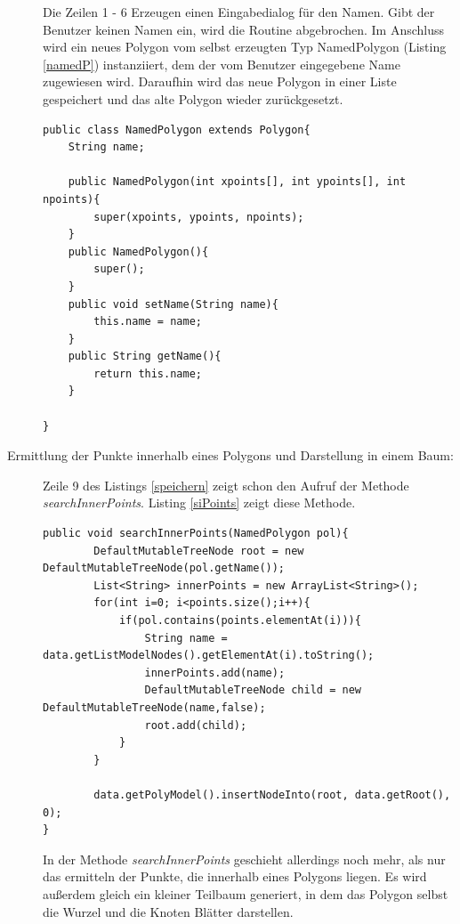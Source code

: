 \begin{description}
Die Zeilen 1 - 6 Erzeugen einen Eingabedialog für den Namen. Gibt der Benutzer keinen Namen ein, wird die Routine abgebrochen. Im Anschluss wird ein neues Polygon vom selbst erzeugten Typ NamedPolygon (Listing \ref{namedP}) instanziiert, dem der vom Benutzer eingegebene Name zugewiesen wird. Daraufhin wird das neue Polygon in einer Liste gespeichert und das alte Polygon wieder zurückgesetzt. 
\begin{lstlisting}[captionpos=b, caption=Klassendefinition des NamedPolygon, label=namedP]
public class NamedPolygon extends Polygon{
    String name;

    public NamedPolygon(int xpoints[], int ypoints[], int npoints){
        super(xpoints, ypoints, npoints);
    }
    public NamedPolygon(){
        super();
    }
    public void setName(String name){
        this.name = name;
    }
    public String getName(){
        return this.name;
    }

}
\end{lstlisting}

\item[Ermittlung der Punkte innerhalb eines Polygons und Darstellung in einem Baum:] Zeile 9 des Listings \ref{speichern} zeigt schon den Aufruf der Methode \emph{searchInnerPoints}. Listing \ref{siPoints} zeigt diese Methode.
\begin{lstlisting}[captionpos=b, caption=Methode searchInnerPoints, label=siPoints]
public void searchInnerPoints(NamedPolygon pol){
        DefaultMutableTreeNode root = new DefaultMutableTreeNode(pol.getName());
        List<String> innerPoints = new ArrayList<String>();
        for(int i=0; i<points.size();i++){
            if(pol.contains(points.elementAt(i))){
                String name = data.getListModelNodes().getElementAt(i).toString();
                innerPoints.add(name);
                DefaultMutableTreeNode child = new DefaultMutableTreeNode(name,false);
                root.add(child);
            }
        }
        
        data.getPolyModel().insertNodeInto(root, data.getRoot(), 0);
}
\end{lstlisting}

In der Methode \emph{searchInnerPoints} geschieht allerdings noch mehr, als nur das ermitteln der Punkte, die innerhalb eines Polygons liegen. Es wird außerdem gleich ein kleiner Teilbaum generiert, in dem das Polygon  selbst die Wurzel und die Knoten Blätter darstellen.

\end{description}

\begin{lstlisting}[captionpos=b, caption=Mehr Text, label=code]

\end{lstlisting}
